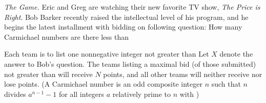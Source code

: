 \textit{The Game.} Eric and Greg are watching their new favorite TV show, \textit{The Price is Right}. Bob Barker recently raised the intellectual level of his program, and he begins the latest installment with bidding on following question: How many Carmichael numbers are there less than 

Each team is to list one nonnegative integer not greater than  Let $X$ denote the answer to Bob’s question. The teams listing  a maximal bid (of those submitted) not greater than  will receive $N$ points, and all other teams will neither receive nor lose points. (A Carmichael number is an odd composite integer $n$ such that $n$ divides $a^{n-1}-1$ for all integers $a$ relatively prime to $n$ with )